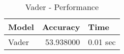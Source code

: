 \begin{table}
\caption{Vader - Performance}
\label{tab:vader}
\begin{tabular}{lrl}
\toprule
Model & Accuracy & Time \\
\midrule
Vader & 53.938000 & 0.01 sec \\
\bottomrule
\end{tabular}
\end{table}
